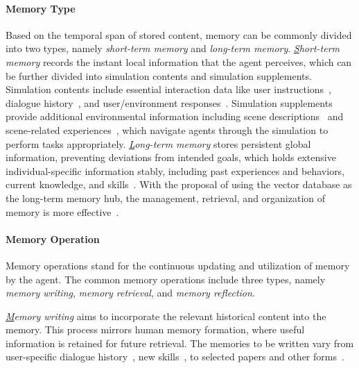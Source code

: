 \paragraph{Memory Type}
Based on the temporal span of stored content, memory can be commonly divided into two types, namely \textit{short-term memory} and \textit{long-term memory}. \textit{{\ul Short-term memory}} records the instant local information that the agent perceives, which can be further divided into simulation contents and simulation supplements. Simulation contents include essential interaction data like user instructions~\cite{schwitzgebel2023creatinglargelanguagemodel,deshpande2023toxicitychatgptanalyzingpersonaassigned}, dialogue history~\cite{xiang2023languagemodelsmeetworld,huang2024embodiedgeneralistagent3d}, and user/environment responses~\cite{xie2023wallstreetneophytezeroshot}. Simulation supplements provide additional environmental information including scene descriptions~\cite{xie2023wallstreetneophytezeroshot,agrawal-etal-2023-multimodal} and scene-related experiences~\cite{shao2023characterllmtrainableagentroleplaying,xu2024characterdestinylargelanguage}, which navigate agents through the simulation to perform tasks appropriately.
\textit{{\ul Long-term memory}} stores persistent global information, preventing deviations from intended goals, which holds extensive individual-specific information stably, including past experiences and behaviors, current knowledge, and skills~\cite{li2024econagentlargelanguagemodelempowered,xu2024characterdestinylargelanguage}. With the proposal of using the vector database as the long-term memory hub, the management, retrieval, and organization of memory is more effective~\cite{lin2023agentsimsopensourcesandboxlarge}.

\paragraph{Memory Operation}

Memory operations stand for the continuous updating and utilization of memory by the agent. The common memory operations include three types, namely \textit{memory writing}, \textit{memory retrieval}, and \textit{memory reflection}.

\textit{{\ul Memory writing}} aims to incorporate the relevant historical content into the memory. This process mirrors human memory formation, where useful information is retained for future retrieval. The memories to be written vary from user-specific dialogue history~\cite{li2021dialoguehistorymatterspersonalized}, new skills~\cite{wang2023voyageropenendedembodiedagent}, to selected papers and other forms~\cite{wang2024surveyagentconversationalpersonalizedefficient}.

